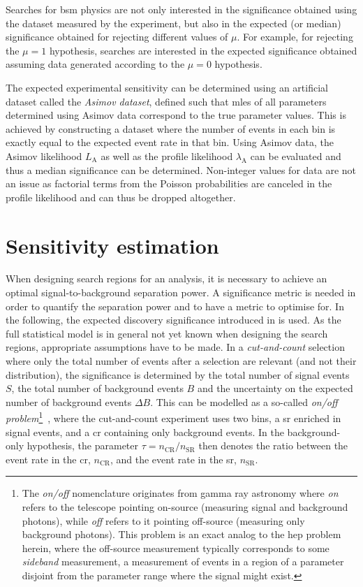 Searches for \gls{bsm} physics are not only interested in the significance obtained using the dataset measured by the experiment, but also in the expected (or median) significance obtained for rejecting different values of $\mu$.
For example, for rejecting the $\mu = 1$ hypothesis, searches are interested in the expected significance obtained assuming data generated according to the $\mu = 0$ hypothesis.

The expected experimental sensitivity can be determined using an artificial dataset called the \textit{Asimov dataset}, defined such that \glspl{mle} of all parameters determined using Asimov data correspond to the true parameter values.
This is achieved by constructing a dataset where the number of events in each bin is exactly equal to the expected event rate in that bin. Using Asimov data, the Asimov likelihood $L_\mathrm{A}$ as well as the profile likelihood $\lambda_\mathrm{A}$ can be evaluated and thus a median significance can be determined.
Non-integer values for data are not an issue as factorial terms from the Poisson probabilities are canceled in the profile likelihood and can thus be dropped altogether. 

\section{Sensitivity estimation}\label{sec:sensitivity_estimation}

When designing search regions for an analysis, it is necessary to achieve an optimal signal-to-background separation power.
A significance metric is needed in order to quantify the separation power and to have a metric to optimise for.
In the following, the expected discovery significance introduced in \cite{Cousins:2007bmb} is used. As the full statistical model is in general not yet known when designing the search regions, appropriate assumptions have to be made. In a \textit{cut-and-count} selection where only the total number of events after a selection are relevant (and not \eg their distribution), the significance is determined by the total number of signal events $S$, the total number of background events $B$ and the uncertainty on the expected number of background events $\Delta B$.
This can be modelled as a so-called \textit{on/off problem}\footnote{The \textit{on/off} nomenclature originates from gamma ray astronomy where \textit{on} refers to the telescope pointing on-source (measuring signal and background photons), while \textit{off} refers to it pointing off-source (measuring only background photons). This problem is an exact analog to the \gls{hep} problem herein, where the off-source measurement typically corresponds to some \textit{sideband} measurement, \ie a measurement of events in a region of a parameter disjoint from the parameter range where the signal might exist.}~\cite{Cousins:2007bmb, Cranmer:2005hi}, where the cut-and-count experiment uses two bins, a \gls{sr} enriched in signal events, and a \gls{cr} containing only background events.
In the background-only hypothesis, the parameter $\tau = n_\mathrm{CR} / n_\mathrm{SR}$ then denotes the ratio between the event rate in the \gls{cr}, $n_\mathrm{CR}$, and the event rate in the \gls{sr}, $n_\mathrm{SR}$.

